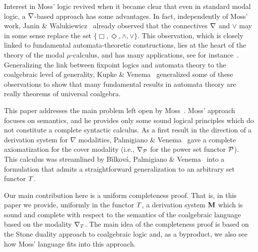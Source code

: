 \documentclass{book}
\begin{document}
Interest in Moss' logic revived when it became clear that even in
standard modal logic, a $\nabla$-based approach has some advantages.
In fact, independently of Moss' work, Janin \&
Walukiewicz~\cite{jani:auto95} already observed that the connectives
$\nabla$ and $\lor$ may in some sense replace the set $\{
\Box,\Diamond,\land,\lor \}$.  This observation, which is closely
linked to fundamental automata-theoretic constructions, lies at the
heart of the theory of the modal $\mu$-calculus, and has many
applications, see for instance~\cite{dago:moda06,sant:comp07}.
Generalizing the link between fixpoint logics and automata theory to
the coalgebraic level of generality, Kupke \&
Venema~\cite{kupk:coal08} generalized some of these observations to
show that many fundamental results in automata theory are really
theorems of universal coalgebra.

This paper addresses the main problem left open by
Moss~\cite{moss:cl}.  Moss' approach focuses on semantics, and he
provides only some sound logical principles which do not constitute a
complete syntactic calculus.  As a first result in the direction of a
derivation system for $\nabla$ modalities, Palmigiano \&
Venema~\cite{palm:nabl07} gave a complete axiomatization for the cover
modality (i.e., $\nabla_{\mathcal{P}}$ for the power set functor $\mathcal{P}$).  This
calculus was streamlined by B{\'\i}lkov\'a, Palmigiano \&
Venema~\cite{bilk:proo08} into a formulation that admits a
straightforward generalization to an arbitrary set functor $T$.

Our main contribution here is a uniform completeness proof.  That is,
in this paper we provide, uniformly in the functor $T$, a derivation
system $\mathbf{M}$ which is sound and complete with respect to the
semantics of the coalgebraic language based on the modality
$\nabla_{T}$.  The main idea of the completeness proof is based on the
Stone duality approach to coalgebraic logic and, as a byproduct,
we also see how Moss' language fits into this approach.
\end{document}
